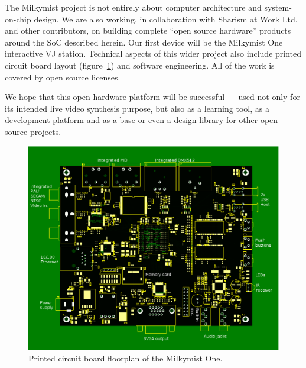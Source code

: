 \documentclass[a4paper,11pt]{kthesis}
\begin{document}
The Milkymist project is not entirely about computer architecture and system-on-chip design. We are also working, in collaboration with Sharism at Work Ltd. and other contributors, on building complete ``open source hardware'' products around the SoC described herein. Our first device will be the Milkymist One interactive VJ station. Technical aspects of this wider project also include printed circuit board layout (figure~\ref{fig:mm1}) and software engineering. All of the work is covered by open source licenses.

We hope that this open hardware platform will be successful --- used not only for its intended live video synthesis purpose, but also as a learning tool, as a development platform and as a base or even a design library for other open source projects.

\begin{figure}[htp]
\centering
\includegraphics[width=\textwidth]{mm1.eps}
\caption{Printed circuit board floorplan of the Milkymist One.}
\label{fig:mm1}
\end{figure}

{}

\end{document}
